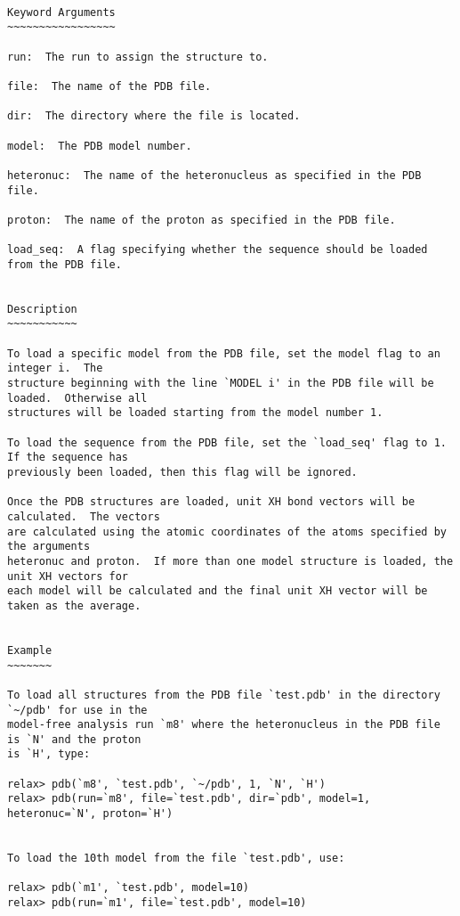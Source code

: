 {\scriptsize
\begin{verbatim}

Keyword Arguments
~~~~~~~~~~~~~~~~~

run:  The run to assign the structure to.

file:  The name of the PDB file.

dir:  The directory where the file is located.

model:  The PDB model number.

heteronuc:  The name of the heteronucleus as specified in the PDB file.

proton:  The name of the proton as specified in the PDB file.

load_seq:  A flag specifying whether the sequence should be loaded from the PDB file.


Description
~~~~~~~~~~~

To load a specific model from the PDB file, set the model flag to an integer i.  The
structure beginning with the line `MODEL i' in the PDB file will be loaded.  Otherwise all
structures will be loaded starting from the model number 1.

To load the sequence from the PDB file, set the `load_seq' flag to 1.  If the sequence has
previously been loaded, then this flag will be ignored.

Once the PDB structures are loaded, unit XH bond vectors will be calculated.  The vectors
are calculated using the atomic coordinates of the atoms specified by the arguments
heteronuc and proton.  If more than one model structure is loaded, the unit XH vectors for
each model will be calculated and the final unit XH vector will be taken as the average.


Example
~~~~~~~

To load all structures from the PDB file `test.pdb' in the directory `~/pdb' for use in the
model-free analysis run `m8' where the heteronucleus in the PDB file is `N' and the proton
is `H', type:

relax> pdb(`m8', `test.pdb', `~/pdb', 1, `N', `H')
relax> pdb(run=`m8', file=`test.pdb', dir=`pdb', model=1, heteronuc=`N', proton=`H')


To load the 10th model from the file `test.pdb', use:

relax> pdb(`m1', `test.pdb', model=10)
relax> pdb(run=`m1', file=`test.pdb', model=10)
\end{verbatim}
}



\newpage


